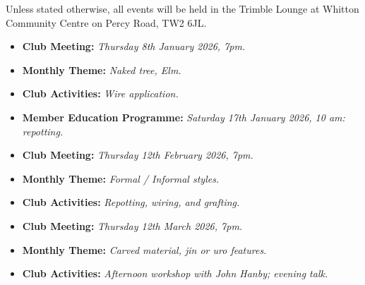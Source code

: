 \label{2025-12-themes}
\noindent
Unless stated otherwise, all events will be held in the Trimble Lounge at Whitton Community Centre on Percy Road, TW2 6JL.


\begin{itemize}
    \item \textbf{Club Meeting:} \textit{Thursday 8th January 2026, 7pm.}
    \item \textbf{Monthly Theme:} \textit{Naked tree, Elm.}
    \item \textbf{Club Activities:} \textit{Wire application.}
    \item \textbf{Member Education Programme:} \textit{Saturday 17th January 2026, 10 am: repotting.}
\end{itemize}

\begin{itemize}
    \item \textbf{Club Meeting:} \textit{Thursday 12th February 2026, 7pm.}
    \item \textbf{Monthly Theme:} \textit{Formal / Informal styles.}
    \item \textbf{Club Activities:} \textit{Repotting, wiring, and grafting.}
\end{itemize}

\begin{itemize}
    \item \textbf{Club Meeting:} \textit{Thursday 12th March 2026, 7pm.}
    \item \textbf{Monthly Theme:} \textit{Carved material, jin or uro features.}
    \item \textbf{Club Activities:} \textit{Afternoon workshop with John Hanby; evening talk.}
\end{itemize}

